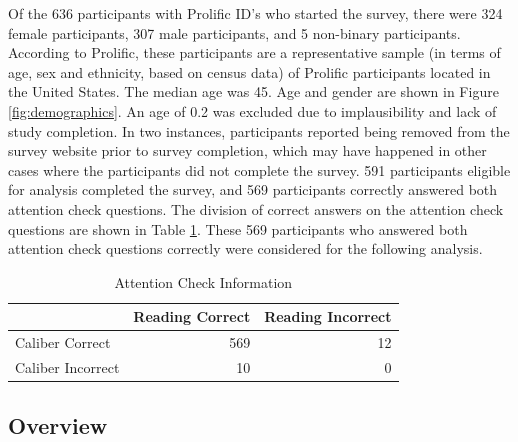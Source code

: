 \documentclass[print]{nuthesis}
\begin{document}
Of the 636 participants with Prolific ID's who started the survey, there were 324 female participants, 307 male participants, and 5 non-binary participants.
According to Prolific, these participants are a representative sample (in terms of age, sex and ethnicity, based on census data) of Prolific participants located in the United States.
The median age was 45.
Age and gender are shown in Figure \ref{fig:demographics}.
An age of 0.2 was excluded due to implausibility and lack of study completion.
In two instances, participants reported being removed from the survey website prior to survey completion, which may have happened in other cases where the participants did not complete the survey.
591 participants eligible for analysis completed the survey, and 569 participants correctly answered both attention check questions.
The division of correct answers on the attention check questions are shown in Table \ref{tab:attentioncheck}.
These 569 participants who answered both attention check questions correctly were considered for the following analysis.

\begin{table}

\caption{\label{tab:attentioncheck}Attention Check Information}
\centering
\begin{tabular}[t]{l|r|r}
\hline
  & Reading Correct & Reading Incorrect\\
\hline
Caliber Correct & 569 & 12\\
\hline
Caliber Incorrect & 10 & 0\\
\hline
\end{tabular}
\end{table}

\hypertarget{overview}{%
\subsection{Overview}\label{overview}}
\end{document}
